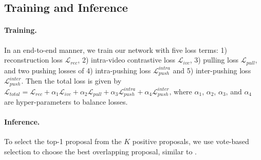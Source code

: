 \subsection{Training and Inference}
\label{sec:training-and-inference}

\paragraph{Training.}
In an end-to-end manner, we train our network with five loss terms: 1)  reconstruction loss $\mathcal{L}_{rec}$, 2)  intra-video contrastive loss $\mathcal{L}_{ivc}$, 3)  pulling loss $\mathcal{L}_{pull}$, and two pushing losses of 4) intra-pushing loss $\mathcal{L}^{intra}_{push}$ and 5) inter-pushing loss $\mathcal{L}^{inter}_{push}$. Then the total loss is given by
\begin{math}
  \mathcal{L}_{total}=\mathcal{L}_{rec}+\alpha_{1}\mathcal{L}_{ivc}+\alpha_{2}\mathcal{L}_{pull}+\alpha_{3}\mathcal{L}^{intra}_{push} + \alpha_{4}\mathcal{L}^{inter}_{push} \text{,}
\end{math}
where  $\alpha_{1}$, $\alpha_{2}$, $\alpha_{3}$, and $\alpha_{4}$ are hyper-parameters  to balance losses.

\paragraph{Inference.}
To select the top-1 proposal from the $K$ positive proposals, we use vote-based selection to choose the best overlapping proposal, similar to \cite{zhou2021ensemble, zheng2022cpl}.
